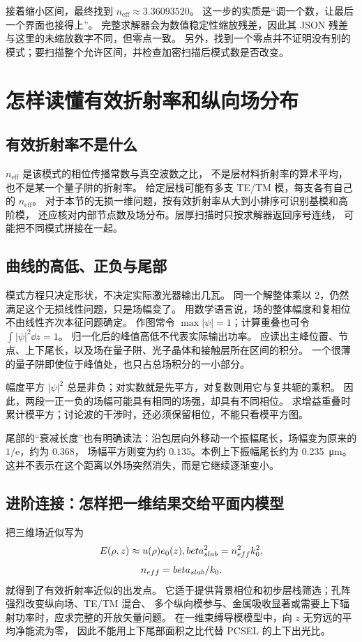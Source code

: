 接着缩小区间，最终找到 $n_{\mathrm{eff}}\approx3.36093520$。
这一步的实质是“调一个数，让最后一个界面也接得上”。
完整求解器会为数值稳定性缩放残差，因此其 JSON 残差与这里的未缩放数字不同，但零点一致。
另外，找到一个零点并不证明没有别的模式；要扫描整个允许区间，并检查加密扫描后模式数是否改变。

\section{怎样读懂有效折射率和纵向场分布}
\label{sec:vertical-interpretation}
\subsection{有效折射率不是什么}
$n_{\mathrm{eff}}$ 是该模式的相位传播常数与真空波数之比，
不是层材料折射率的算术平均，也不是某一个量子阱的折射率。
给定层栈可能有多支 TE/TM 模，每支各有自己的 $n_{\mathrm{eff}}$。
对于本节的无损一维问题，按有效折射率从大到小排序可识别基模和高阶模，
还应核对内部节点数及场分布。层厚扫描时只按求解器返回序号连线，
可能把不同模式拼接在一起。

\subsection{曲线的高低、正负与尾部}
模式方程只决定形状，不决定实际激光器输出几瓦。
同一个解整体乘以 2，仍然满足这个无损线性问题，只是场幅变了。
用数学语言说，场的整体幅度和复相位不由线性齐次本征问题确定。
作图常令 $\max|\psi|=1$；计算重叠也可令 $\int|\psi|^2\dd z=1$。
归一化后的峰值高低不代表实际输出功率。
应读出主峰位置、节点、上下尾长，以及场在量子阱、光子晶体和接触层所在区间的积分。
一个很薄的量子阱即使位于峰值处，也只占总场积分的一小部分。

幅度平方 $|\psi|^2$ 总是非负；对实数就是先平方，对复数则用它与复共轭的乘积。
因此，两段一正一负的场幅可能具有相同的场强，却具有不同相位。
求增益重叠时累计模平方；讨论波的干涉时，还必须保留相位，不能只看模平方图。

尾部的“衰减长度”也有明确读法：沿包层向外移动一个振幅尾长，场幅变为原来的 $1/\mathrm e$，约为 $0.368$，
场幅平方则变为约 $0.135$。本例上下振幅尾长约为 \SI{0.235}{\micro\meter}。
这并不表示在这个距离以外场突然消失，而是它继续逐渐变小。

\subsection{进阶连接：怎样把一维结果交给平面内模型}

把三维场近似写为
\begin{equation}
E(\rho,z)\approx u(\rho)e_0(z),
beta_{slab}^2=n_{eff}^2k_0^2,
\label{eq:separation_ansatz_epi}
\end{equation}
\begin{equation}
n_{eff}=beta_{slab}/k_0.
\label{eq:neff_def}
\end{equation}
\label{eq:beta_neff}
就得到了有效折射率近似的出发点。
它适于提供背景相位和初步层栈筛选；孔阵强烈改变纵向场、TE/TM 混合、
多个纵向模参与、金属吸收显著或需要上下辐射功率时，应求完整的开放矢量问题。
在一维束缚导模模型中，向 $z$ 无穷远的平均净能流为零，
因此不能用上下尾部面积之比代替 PCSEL 的上下出光比。

